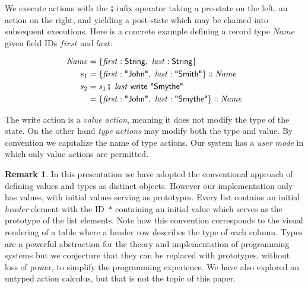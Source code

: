 \documentclass[english,submission]{programming}
\theoremstyle{definition}
\newtheorem*{remark}{Remark}
\newcommand{\mathbox}[1]{\colorbox{black!10}{$#1$}}
\DeclareMathOperator{\exec}{\fatsemi\ }
\newcommand{\isa}{\dblcolon}
\newcommand{\quotedstring}[1]{\textsf{\textquotedbl{#1}\textquotedbl}}
\begin{document}
We execute actions with the \mathbox{\fatsemi} infix operator taking a pre-state on the left, an action on the right, and yielding a post-state which may be chained into subsequent executions. Here is a concrete example defining a record type \mathbox{\mathit{Name}} given field IDs \mathbox{\mathit{first}} and \mathbox{\mathit{last}}:

\begin{align*}
\mathit{Name} &= \{\mathit{first}  : \textsf{String},\  \mathit{last} : \textsf{String}\}\\
s_1 &= \{\mathit{first}: \quotedstring{John},\  \mathit{last}: \quotedstring{Smith}\} \isa \mathit{Name}\\
s_2 &= s_1 \exec \mathit{last} \textsf{ write } \quotedstring{Smythe}\\
&= \{\mathit{first}: \quotedstring{John},\  \mathit{last}: \quotedstring{Smythe}\} \isa \mathit{Name}\\
\end{align*}

The \textsf{write} action is a \textit{value action}, meaning it does not modify the type of the state. On the other hand \textit{type actions} may modify both the type and value. By convention we capitalize the name of type actions. Our system has a \textit{user mode} in which only value actions are permitted.

\begin{remark}
In this presentation we have adopted the conventional approach of defining values and types as distinct objects. However our implementation only has values, with initial values serving as prototypes. Every list contains an initial \textit{header} element with the ID~\mathbox{*} containing an initial value which serves as the prototype of the list elements. Note how this convention corresponds to the visual rendering of a table where a header row describes the type of each column. Types are a powerful abstraction for the theory and implementation of programming systems but we conjecture that they can be replaced with prototypes, without loss of power, to simplify the programming experience. We have also explored an untyped action calculus\cite{denicek}, but that is not the topic of this paper.
\end{remark}
\end{document}
